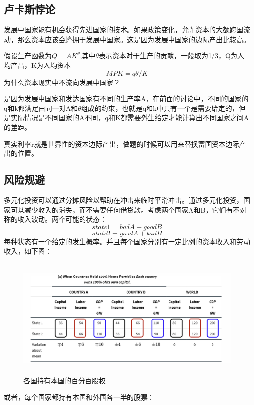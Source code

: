 \documentclass[a4paper, 10pt]{article}
\begin{document}
\subsection{卢卡斯悖论}
\noindent 发展中国家能有机会获得先进国家的技术。如果政策变化，允许资本的大额跨国流动，那么资本应该会蜂拥于发展中国家。这是因为发展中国家的边际产出比较高。

\noindent 假设生产函数为$Q=AK^\theta$,其中$\theta$表示资本对于生产的贡献，一般取为1/3，Q为人均产出，K为人均资本
$$MPK=q\theta/K$$
为什么资本现实中不流向发展中国家？

\noindent 是因为发展中国家和发达国家有不同的生产率A，在前面的讨论中，不同的国家的q和k都满足由同一对A和$\theta$组成的约束，也就是q和k中只有一个是需要给定的，但是实际情况是不同国家的A不同，q和K都需要外生给定才能计算出不同国家之间A的差距。

\noindent 真实利率r就是世界性的资本边际产出，做题的时候可以用来替换富国资本边际产出的位置。

\subsection{风险规避}
\noindent 多元化投资可以通过分摊风险以帮助在冲击来临时平滑冲击。通过多元化投资，国家可以减少收入的消失，而不需要任何借贷款。考虑两个国家A和B，它们有不对称的收入波动。两个可能的状态：
 $$state1=badA+goodB$$
 $$state2=goodA+badB$$
 每种状态有一个给定的发生概率。并且每个国家分别有一定比例的资本收入和劳动收入，如下图：

\begin{figure}[h]
  \centering 
  \includegraphics[height=6.0cm,width=12.0cm]{pic2.png}
  
  \caption{各国持有本国的百分百股权}
  \label{2}
  
  \end{figure}
或者，每个国家都持有本国和外国各一半的股票：
\end{document}
